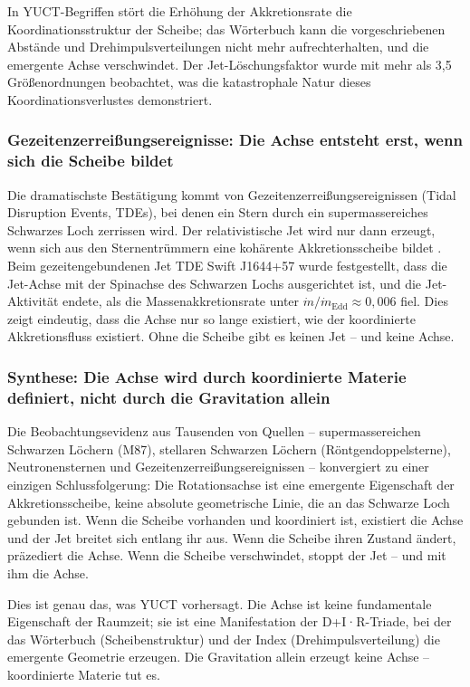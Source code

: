 \documentclass[12pt,a4paper]{article}
\begin{document}
	In YUCT-Begriffen stört die Erhöhung der Akkretionsrate die Koordinationsstruktur der Scheibe; das Wörterbuch kann die vorgeschriebenen Abstände und Drehimpulsverteilungen nicht mehr aufrechterhalten, und die emergente Achse verschwindet. Der Jet-Löschungsfaktor wurde mit mehr als 3,5 Größenordnungen beobachtet, was die katastrophale Natur dieses Koordinationsverlustes demonstriert.
	
	\subsubsection{Gezeitenzerreißungsereignisse: Die Achse entsteht erst, wenn sich die Scheibe bildet}
	
	Die dramatischste Bestätigung kommt von Gezeitenzerreißungsereignissen (Tidal Disruption Events, TDEs), bei denen ein Stern durch ein supermassereiches Schwarzes Loch zerrissen wird. Der relativistische Jet wird nur dann erzeugt, wenn sich aus den Sternentrümmern eine kohärente Akkretionsscheibe bildet \cite{TDE2016,TDE2020}. Beim gezeitengebundenen Jet TDE Swift J1644+57 wurde festgestellt, dass die Jet-Achse mit der Spinachse des Schwarzen Lochs ausgerichtet ist, und die Jet-Aktivität endete, als die Massenakkretionsrate unter \(\dot{m}/\dot{m}_{\text{Edd}} \approx 0,006\) fiel. Dies zeigt eindeutig, dass die Achse nur so lange existiert, wie der koordinierte Akkretionsfluss existiert. Ohne die Scheibe gibt es keinen Jet – und keine Achse.
	
	\subsubsection{Synthese: Die Achse wird durch koordinierte Materie definiert, nicht durch die Gravitation allein}
	
	Die Beobachtungsevidenz aus Tausenden von Quellen – supermassereichen Schwarzen Löchern (M87), stellaren Schwarzen Löchern (Röntgendoppelsterne), Neutronensternen und Gezeitenzerreißungsereignissen – konvergiert zu einer einzigen Schlussfolgerung: Die Rotationsachse ist eine emergente Eigenschaft der Akkretionsscheibe, keine absolute geometrische Linie, die an das Schwarze Loch gebunden ist. Wenn die Scheibe vorhanden und koordiniert ist, existiert die Achse und der Jet breitet sich entlang ihr aus. Wenn die Scheibe ihren Zustand ändert, präzediert die Achse. Wenn die Scheibe verschwindet, stoppt der Jet – und mit ihm die Achse.
	
	Dies ist genau das, was YUCT vorhersagt. Die Achse ist keine fundamentale Eigenschaft der Raumzeit; sie ist eine Manifestation der D+I·R-Triade, bei der das Wörterbuch (Scheibenstruktur) und der Index (Drehimpulsverteilung) die emergente Geometrie erzeugen. Die Gravitation allein erzeugt keine Achse – koordinierte Materie tut es.
	
\end{document}
